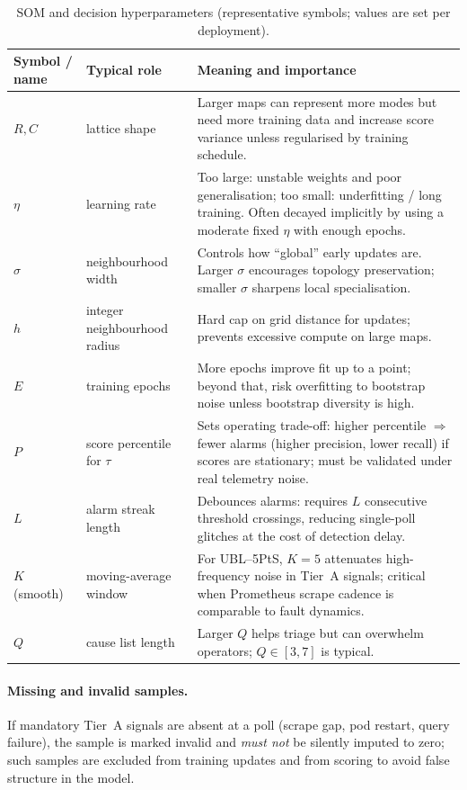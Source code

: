 \documentclass[11pt,a4paper]{article}
\begin{document}
\begin{table}[htbp]
\centering
\caption{SOM and decision hyperparameters (representative symbols; values are set per deployment).}
\label{tab:som-hyper}
\begin{tabular}{@{}p{3.2cm}p{2.0cm}p{9.0cm}@{}}
\toprule
\textbf{Symbol / name} & \textbf{Typical role} & \textbf{Meaning and importance} \\
\midrule
$R,C$ & lattice shape & Larger maps can represent more modes but need more training data and increase score variance unless regularised by training schedule. \\
$\eta$ & learning rate & Too large: unstable weights and poor generalisation; too small: underfitting / long training. Often decayed implicitly by using a moderate fixed $\eta$ with enough epochs. \\
$\sigma$ & neighbourhood width & Controls how ``global'' early updates are. Larger $\sigma$ encourages topology preservation; smaller $\sigma$ sharpens local specialisation. \\
$h$ & integer neighbourhood radius & Hard cap on grid distance for updates; prevents excessive compute on large maps. \\
$E$ & training epochs & More epochs improve fit up to a point; beyond that, risk overfitting to bootstrap noise unless bootstrap diversity is high. \\
$P$ & score percentile for $\tau$ & Sets operating trade-off: higher percentile $\Rightarrow$ fewer alarms (higher precision, lower recall) if scores are stationary; must be validated under real telemetry noise. \\
$L$ & alarm streak length & Debounces alarms: requires $L$ consecutive threshold crossings, reducing single-poll glitches at the cost of detection delay. \\
$K$ (smooth) & moving-average window & For UBL--5PtS, $K{=}5$ attenuates high-frequency noise in Tier~A signals; critical when Prometheus scrape cadence is comparable to fault dynamics. \\
$Q$ & cause list length & Larger $Q$ helps triage but can overwhelm operators; $Q{\in}[3,7]$ is typical. \\
\bottomrule
\end{tabular}
\end{table}

\paragraph{Missing and invalid samples.}
If mandatory Tier~A signals are absent at a poll (scrape gap, pod restart, query failure), the sample is marked invalid and \emph{must not} be silently imputed to zero; such samples are excluded from training updates and from scoring to avoid false structure in the model.
\end{document}
